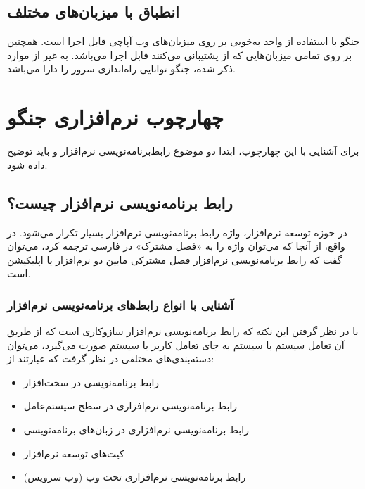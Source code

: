 {\subsection{انطباق با میزبان‌های مختلف}
جنگو با استفاده از واحد  به‌خوبی بر روی میزبان‌های وب آپاچی قابل اجرا است. همچنین بر روی تمامی میزبان‌هایی که از پشتیبانی می‌کنند قابل اجرا می‌باشد. به غیر از موارد ذکر شده، جنگو توانایی راه‌اندازی سرور  را دارا می‌باشد.
 
\section{چهارچوب نرم‌افزاری  جنگو}
برای آشنایی با این چهارچوب، ابتدا دو موضوع رابط‌برنامه‌نویسی نرم‌افزار و  باید توضیح داده شود.
 
\subsection{رابط برنامه‌نویسی نرم‌افزار چیست؟}
در حوزه توسعه نرم‌افزار، واژه‌ رابط برنامه‌نویسی نرم‌افزار بسیار تکرار می‌شود. در واقع، از آنجا که می‌توان واژه  را به «فصل مشترک» در فارسی ترجمه کرد، می‌توان گفت که رابط برنامه‌نویسی نرم‌افزار فصل مشترکی مابین دو نرم‌افزار یا اپلیکیشن است.
\subsubsection{آشنایی با انواع رابط‌های برنامه‌نویسی نرم‌افزار}
با در نظر گرفتن این نکته که رابط‌ برنامه‌نویسی نرم‌افزار سازوکاری است که از طریق آن تعامل سیستم با سیستم به جای تعامل کاربر با سیستم صورت می‌گیرد، می‌توان دسته‌بند‌ی‌های مختلفی در نظر گرفت که عبارتند از:

\begin{itemize}
	\item رابط برنامه‌نویسی در سخت‌افزار
	\item رابط برنامه‌نویسی نرم‌افزاری در سطح سیستم‌عامل
	\item رابط برنامه‌نویسی نرم‌افزاری در زبان‌های برنامه‌نویسی
	\item کیت‌های توسعه نرم‌افزار
	\item رابط برنامه‌نویسی نرم‌افزاری تحت وب (وب سرویس)
\end{itemize}
 

}
